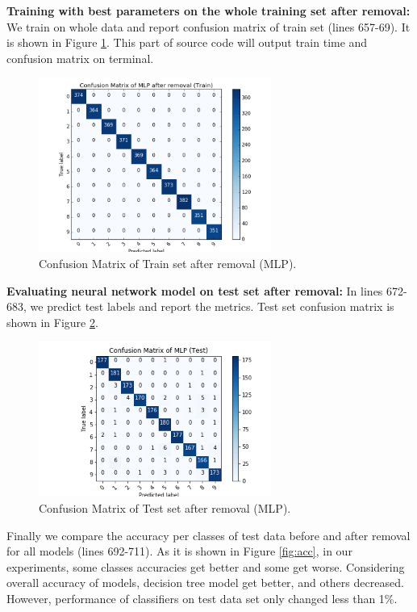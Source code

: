 \documentclass[12pt]{article}
\begin{document}
\textbf{Training with best parameters on the whole training set after removal:} We train on whole data and report confusion matrix of train set (lines 657-69). It is shown in Figure \ref{fig:remlptrain}. This part of source code will output train time and confusion matrix on terminal.\\
\begin{figure}[h] 
	\begin{center}
		\includegraphics[width=3in]{remlptrain.png}
		\caption{Confusion Matrix of Train set after removal (MLP).}
		\label{fig:remlptrain}
	\end{center}
\end{figure} 
\textbf{Evaluating neural network model on test set after removal:} In lines 672-683, we predict test labels and report the metrics. Test set confusion matrix is shown in Figure \ref{fig:remlptest}.\\
\begin{figure}[ht] 
	\begin{center}
		\includegraphics[width=3in]{mlptest.png}
		\caption{Confusion Matrix of Test set after removal (MLP).}
		\label{fig:remlptest}
	\end{center}
\end{figure}
\newpage 
Finally we compare the accuracy per classes of test data before and after removal for all models (lines 692-711). As it is shown in Figure \ref{fig:acc}, in our experiments, some classes accuracies get better and some get worse. Considering overall accuracy of models, decision tree model get better, and others decreased. However, performance of classifiers on test data set only changed less than 1\%. 
\end{document}
